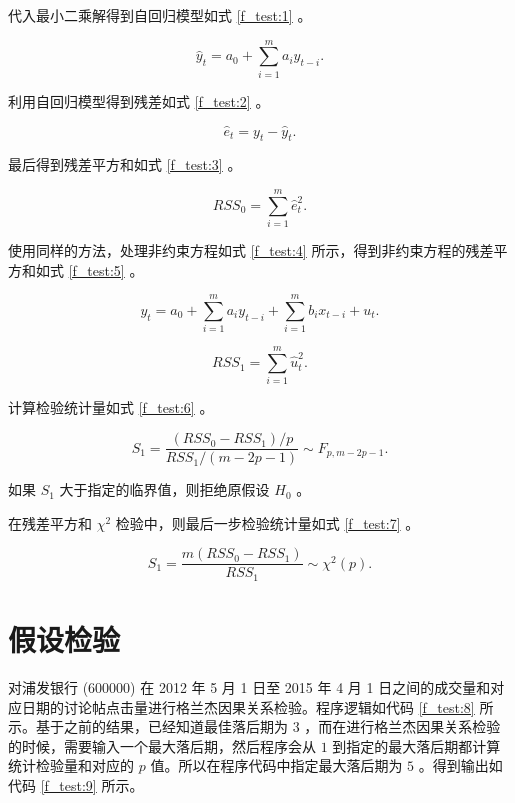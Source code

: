 代入最小二乘解得到自回归模型如式 \ref{f_test:1} 。

\begin{equation}
  \label{f_test:1}
  \hat{y}_t=a_{0}+\sum_{i=1}^{m}a_{i}y_{t-i}.
\end{equation}

利用自回归模型得到残差如式 \ref{f_test:2} 。

\begin{equation}
  \label{f_test:2}
  \hat{e}_t=y_{t}-\hat{y}_t.
\end{equation}

最后得到残差平方和如式 \ref{f_test:3} 。

\begin{equation}
  \label{f_test:3}
  RSS_{0}=\sum_{i=1}^{m}\hat{e}_{t}^2.
\end{equation}

使用同样的方法，处理非约束方程如式 \ref{f_test:4} 所示，得到非约束方程的残差平方和如式 \ref{f_test:5} 。

\begin{equation}
  \label{f_test:4}
  y_{t}=a_{0}+\sum_{i=1}^{m}a_{i}y_{t-i}+\sum_{i=1}^{m}b_{i}x_{t-i}+u_{t}.
\end{equation}

\begin{equation}
  \label{f_test:5}
  RSS_{1}=\sum_{i=1}^{m}\hat{u}_{t}^2.
\end{equation}

计算检验统计量如式 \ref{f_test:6} 。

\begin{equation}
  \label{f_test:6}
  S_{1}=\frac{(RSS_{0}-RSS_{1})/p}{RSS_{1}/(m-2p-1)}\sim F_{p,m-2p-1}.
\end{equation}

如果 $S_{1}$ 大于指定的临界值，则拒绝原假设 $H_{0}$ 。

在残差平方和 $\chi^{2}$ 检验中，则最后一步检验统计量如式 \ref{f_test:7} 。

\begin{equation}
  \label{f_test:7}
  S_{1}=\frac{m(RSS_{0}-RSS_{1})}{RSS_{1}}\sim \chi^{2}(p).
\end{equation}

\section{假设检验}

对浦发银行 (600000) 在 2012 年 5 月 1 日至 2015 年 4 月 1 日之间的成交量和对应日期的讨论帖点击量进行格兰杰因果关系检验。程序逻辑如代码 \ref{f_test:8} 所示。基于之前的结果，已经知道最佳落后期为 $3$ ，而在进行格兰杰因果关系检验的时候，需要输入一个最大落后期，然后程序会从 $1$ 到指定的最大落后期都计算统计检验量和对应的 $p$ 值。所以在程序代码中指定最大落后期为 $5$ 。得到输出如代码 \ref{f_test:9} 所示。

